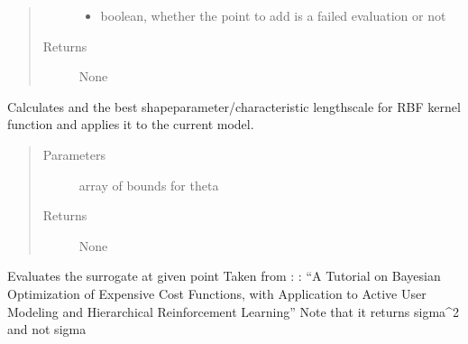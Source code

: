 \documentclass[letterpaper,12pt,english]{sphinxmanual}
\begin{document}
\begin{fulllineitems}
\begin{fulllineitems}
\begin{quote}
\begin{description}
\begin{itemize}
\item {} 
\sphinxAtStartPar
{} \textendash{} boolean, whether the point to add is a failed evaluation or not

\end{itemize}

\item[{Returns}] \leavevmode
\sphinxAtStartPar
None

\end{description}\end{quote}

\end{fulllineitems}


\begin{fulllineitems}
\label{\detokenize{PARyOpt:PARyOpt.paryopt.BayesOpt.estimate_best_kernel_parameters}}
\sphinxAtStartPar
Calculates and  the best shape\sphinxhyphen{}parameter/characteristic length\sphinxhyphen{}scale for RBF kernel function and
applies it to the current model.
\begin{quote}\begin{description}
\item[{Parameters}] \leavevmode
\sphinxAtStartPar
{} \textendash{} array of bounds for theta

\item[{Returns}] \leavevmode
\sphinxAtStartPar
None

\end{description}\end{quote}

\end{fulllineitems}


\begin{fulllineitems}
\label{\detokenize{PARyOpt:PARyOpt.paryopt.BayesOpt.evaluate_surrogate_at}}
\sphinxAtStartPar
Evaluates the surrogate at given point
Taken from :  :
“A Tutorial on Bayesian Optimization of Expensive Cost Functions, with Application to
Active User Modeling and Hierarchical Reinforcement Learning”
Note that it returns sigma\textasciicircum{}2 and not sigma


\end{fulllineitems}
\end{fulllineitems}
\end{document}
